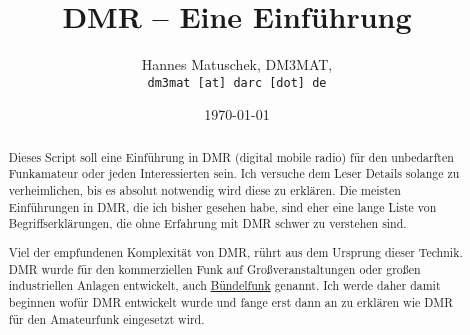 \documentclass[11pt, a4paper,parskip=half]{scrartcl}
\title{DMR -- Eine Einführung}
\author{Hannes Matuschek, DM3MAT,\\\texttt{dm3mat [at] darc [dot] de}}
\date{\today}
\begin{document}
\begin{titlepage}
 \maketitle
 \begin{abstract}
  Dieses Script soll eine Einführung in DMR (digital mobile radio) für den 
  unbedarften Funkamateur oder jeden Interessierten sein. Ich versuche dem 
  Leser Details solange zu verheimlichen, bis es absolut notwendig wird 
  diese zu erklären. Die meisten
  Einführungen in DMR, die ich bisher gesehen habe, sind eher eine lange Liste
  von Begriffserklärungen, die ohne Erfahrung mit DMR schwer zu verstehen sind. 
  
  Viel der empfundenen Komplexität von DMR, rührt aus dem Ursprung dieser 
  Technik. DMR wurde für den kommerziellen Funk auf Großveranstaltungen oder 
  großen industriellen Anlagen entwickelt, auch 
  \href{https://de.wikipedia.org/wiki/B\%C3\%BCndelfunk}{Bündelfunk} genannt. 
  Ich werde daher damit beginnen wofür DMR entwickelt wurde und fange erst dann
  an zu erklären wie DMR für den Amateurfunk eingesetzt wird.
 \end{abstract}
 \vfill
 \tableofcontents
\end{titlepage}









	













\appendix
\printindex
\end{document}
